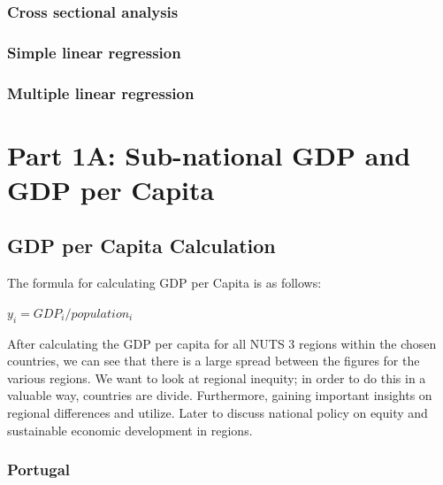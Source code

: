 \documentclass[
  a4paper,
  DIV=11,
  numbers=noendperiod]{scrartcl}
\begin{document}
\hypertarget{cross-sectional-analysis}{%
\subsubsection{Cross sectional
analysis}\label{cross-sectional-analysis}}

\hypertarget{simple-linear-regression}{%
\subsubsection{Simple linear
regression}\label{simple-linear-regression}}

\hypertarget{multiple-linear-regression}{%
\subsubsection{Multiple linear
regression}\label{multiple-linear-regression}}

\hypertarget{part-1a-sub-national-gdp-and-gdp-per-capita}{%
\section{Part 1A: Sub-national GDP and GDP per
Capita}\label{part-1a-sub-national-gdp-and-gdp-per-capita}}

\hypertarget{gdp-per-capita-calculation}{%
\subsection{GDP per Capita
Calculation}\label{gdp-per-capita-calculation}}

The formula for calculating GDP per Capita is as follows:

\(y_i=GDP_i/population_i\)

After calculating the GDP per capita for all NUTS 3 regions within the
chosen countries, we can see that there is a large spread between the
figures for the various regions. We want to look at regional inequity;
in order to do this in a valuable way, countries are divide.
Furthermore, gaining important insights on regional differences and
utilize. Later to discuss national policy on equity and sustainable
economic development in regions.

\hypertarget{portugal}{%
\subsubsection{Portugal}\label{portugal}}
\end{document}
